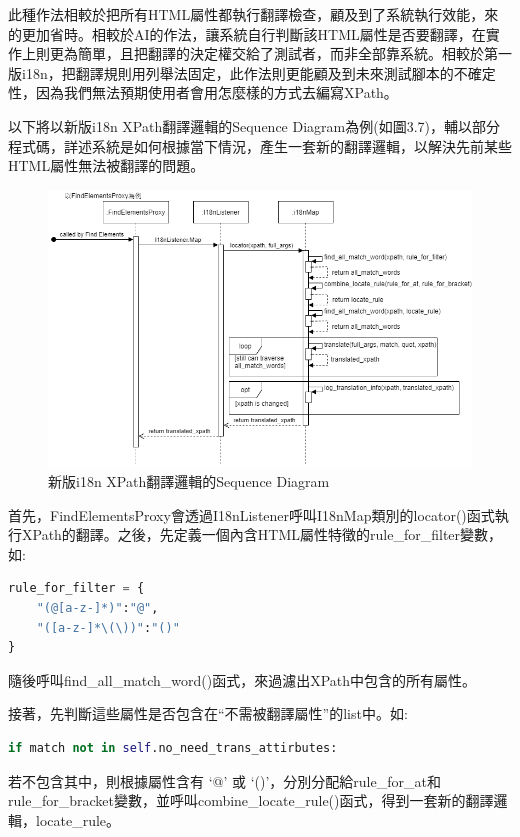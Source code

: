 此種作法相較於把所有HTML屬性都執行翻譯檢查，顧及到了系統執行效能，來的更加省時。相較於AI的作法，讓系統自行判斷該HTML屬性是否要翻譯，在實作上則更為簡單，且把翻譯的決定權交給了測試者，而非全部靠系統。相較於第一版i18n，把翻譯規則用列舉法固定，此作法則更能顧及到未來測試腳本的不確定性，因為我們無法預期使用者會用怎麼樣的方式去編寫XPath。

以下將以新版i18n XPath翻譯邏輯的Sequence Diagram為例(如圖3.7)，輔以部分程式碼，詳述系統是如何根據當下情況，產生一套新的翻譯邏輯，以解決先前某些HTML屬性無法被翻譯的問題。

\begin{figure}[H]
    \includegraphics[width= 1.1\textwidth]{../UML/i18n sequence diagram-xpath翻譯邏輯.png}
    \caption{新版i18n XPath翻譯邏輯的Sequence Diagram}
\end{figure}

首先，FindElementsProxy會透過I18nListener呼叫I18nMap類別的locator()函式執行XPath的翻譯。之後，先定義一個內含HTML屬性特徵的rule\_for\_filter變數，如:
\begin{lstlisting}[language={python}]
rule_for_filter = {
    "(@[a-z-]*)":"@",
    "([a-z-]*\(\))":"()"
}
\end{lstlisting}
隨後呼叫find\_all\_match\_word()函式，來過濾出XPath中包含的所有屬性。

接著，先判斷這些屬性是否包含在“不需被翻譯屬性”的list中。如:
\begin{lstlisting}[language={python}]
if match not in self.no_need_trans_attirbutes:
\end{lstlisting}

若不包含其中，則根據屬性含有 ‘@’ 或 ‘()’，分別分配給rule\_for\_at和rule\_for\_bracket變數，並呼叫combine\_locate\_rule()函式，得到一套新的翻譯邏輯，locate\_rule。

